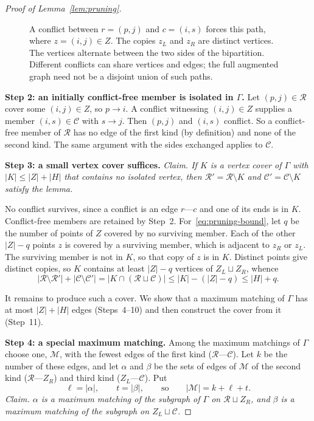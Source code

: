 \documentclass[11pt]{article}
\theoremstyle{remark}
\newcommand{\abs}[1]{\lvert #1\rvert}
\newcommand{\step}[1]{\par\medskip\noindent\textbf{#1}\enspace}
\begin{document}
\begin{proof}[Proof of Lemma~\ref{lem:pruning}]
\begin{figure}[!ht]
 \caption{A conflict between $r=(p,j)$ and $c=(i,s)$ forces this path,
 where $z=(i,j)\in Z$.  The copies $z_L$ and $z_R$ are distinct vertices.
 The vertices alternate between the two sides of the bipartition.
 Different conflicts can share vertices and edges; the full augmented
 graph need not be a disjoint union of such paths.}
 \label{fig:pruning}
\end{figure}

\step{Step 2: an initially conflict-free member is isolated in $\Gamma$.}
Let $(p,j)\in\mathcal R$ cover some $(i,j)\in Z$, so $p\to i$.
A conflict witnessing $(i,j)\in Z$ supplies a member $(i,s)\in\mathcal C$
with $s\to j$.  Then $(p,j)$ and $(i,s)$ conflict.  So a conflict-free
member of $\mathcal R$ has no edge of the first kind (by definition) and
none of the second kind.  The same argument with the sides exchanged
applies to $\mathcal C$.

\step{Step 3: a small vertex cover suffices.}
\emph{Claim.  If $K$ is a vertex cover of $\Gamma$ with
$\abs K\le\abs Z+\abs H$ that contains no isolated vertex, then
$\mathcal R'=\mathcal R\setminus K$ and $\mathcal C'=\mathcal C\setminus K$
satisfy the lemma.}

No conflict survives, since a conflict is an edge $r$---$c$ and one of its
ends is in $K$.  Conflict-free members are retained by Step~2.
For~\eqref{eq:pruning-bound}, let $q$ be the number of points of $Z$
covered by no surviving member.  Each of the other $\abs Z-q$ points $z$ is
covered by a surviving member, which is adjacent to $z_R$ or $z_L$.
The surviving member is not in $K$, so that copy of $z$ is in $K$.
Distinct points give distinct copies, so $K$ contains at least $\abs Z-q$
vertices of $Z_L\sqcup Z_R$, whence
\begin{equation}\label{eq:cover-charge}
 \abs{\mathcal R\setminus\mathcal R'}+\abs{\mathcal C\setminus\mathcal C'}
 =\abs{K\cap(\mathcal R\sqcup\mathcal C)}
 \leq \abs K-(\abs Z-q)\leq\abs H+q.
\end{equation}

\smallskip
It remains to produce such a cover.  We show that a maximum matching of
$\Gamma$ has at most $\abs Z+\abs H$ edges (Steps~4--10) and then construct
the cover from it (Step~11).

\step{Step 4: a special maximum matching.}
Among the maximum matchings of $\Gamma$ choose one, $\mathcal M$, with the
fewest edges of the first kind ($\mathcal R$---$\mathcal C$).  Let $k$ be
the number of these edges, and let $\alpha$ and $\beta$ be the sets of edges
of $\mathcal M$ of the second kind ($\mathcal R$---$Z_R$) and third kind
($Z_L$---$\mathcal C$).  Put
\[
 \ell=\abs\alpha,\qquad t=\abs\beta,
 \qquad\text{so}\qquad\abs{\mathcal M}=k+\ell+t.
\]
\emph{Claim.  $\alpha$ is a maximum matching of the subgraph of $\Gamma$ on
$\mathcal R\sqcup Z_R$, and $\beta$ is a maximum matching of the subgraph on
$Z_L\sqcup\mathcal C$.}


\end{proof}
\end{document}
